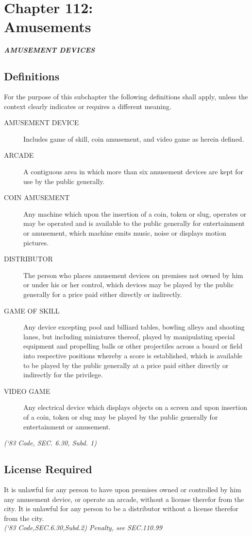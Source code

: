 \chapter*{Chapter 112: \\
	Amusements}
    \minitoc
    \pagebreak

\begin{center}
    \emph{\textbf{\LARGE{AMUSEMENT DEVICES}}}
\end{center}

\section{Definitions}
For the purpose of this subchapter the following definitions shall apply, unless the context clearly indicates or requires a different meaning.
\begin{description}
    \item[AMUSEMENT DEVICE] Includes game of skill, coin amusement, and video game as herein defined.
    \item[ARCADE] A contiguous area in which more than six amusement devices are kept for use by the public generally.
    \item[COIN AMUSEMENT] Any machine which upon the insertion of a coin, token or slug, operates or may be operated and is available to the public generally for entertainment or amusement, which machine emits music, noise or displays motion pictures.
    \item[DISTRIBUTOR] The person who places amusement devices on premises not owned by him or under his or her control, which devices may be played by the public generally for a price paid either directly or indirectly.
    \item[GAME OF SKILL] Any device excepting pool and billiard tables, bowling alleys and shooting lanes, but including miniatures thereof, played by manipulating special equipment and propelling balls or other projectiles across a board or field into respective positions whereby a score is established, which is available to be played by the public generally at a price paid either directly or indirectly for the privilege.
    \item[VIDEO GAME] Any electrical device which displays objects on a screen and upon insertion of a coin, token or slug may be played by the public generally for entertainment or amusement.
\end{description}
\emph{(‘83 Code, SEC. 6.30, Subd. 1)}
\section{License Required}
It is unlawful for any person to have upon premises owned or controlled by him any amusement device, or operate an arcade, without a license therefor from the city. It is unlawful for any person to be a distributor without a license therefor from the city.\\
\emph{(‘83 Code,SEC.6.30,Subd.2) Penalty, see SEC.110.99}
